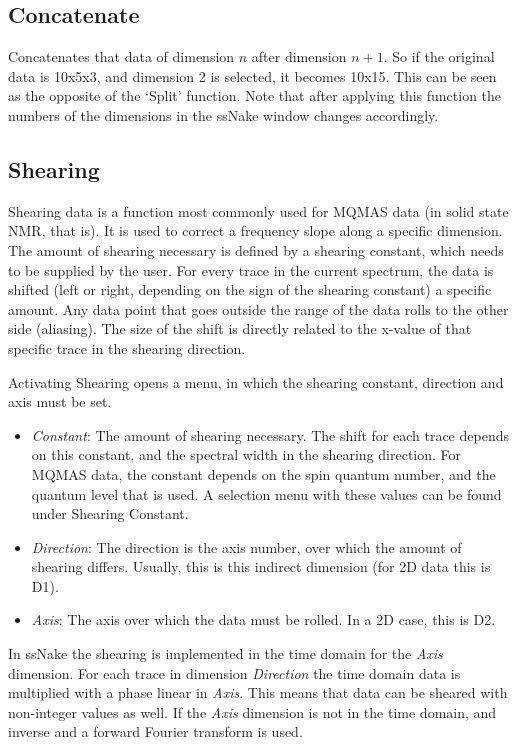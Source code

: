 \documentclass[11pt,a4paper]{article}
\begin{document}
\subsection{Concatenate}
Concatenates that data of dimension $n$ after dimension $n+1$.
So if the original data is 10x5x3, and dimension 2 is selected, it becomes 10x15.
This can be seen as the opposite of the `Split' function.
Note that after applying this function the numbers of the dimensions in the ssNake window changes accordingly.

\subsection{Shearing}
Shearing data is a function most commonly used for MQMAS data (in solid state NMR, that is).
It is used to correct a frequency slope along a specific dimension.
The amount of shearing necessary is defined by a shearing constant, which needs to be supplied by the user.
For every trace in the current spectrum, the data is shifted (left or right, depending on the sign of the shearing constant) a specific amount.
Any data point that goes outside the range of the data rolls to the other side (aliasing).
The size of the shift is directly related to the x-value of that specific trace in the shearing direction.

Activating Shearing opens a menu, in which the shearing constant, direction and axis must be set.

\begin{itemize}
  \item \textit{Constant}: The amount of shearing necessary. The shift for each trace depends on this constant, and the spectral width in the shearing direction.
	 For MQMAS data, the constant depends on the spin quantum number, and the quantum level that is used. A selection menu with these values can be found under Shearing Constant.
  \item \textit{Direction}: The direction is the axis number, over which the amount of shearing differs. Usually, this is this indirect dimension (for 2D data this is D1).
  \item \textit{Axis}: The axis over which the data must be rolled. In a 2D case, this is D2.
\end{itemize}

In ssNake the shearing is implemented in the time domain for the \textit{Axis} dimension.
For each trace in dimension \textit{Direction} the time domain data is multiplied with a phase linear in \textit{Axis}.
This means that data can be sheared with non-integer values as well.
If the \textit{Axis} dimension is not in the time domain, and inverse and a forward Fourier transform is used.
\end{document}
